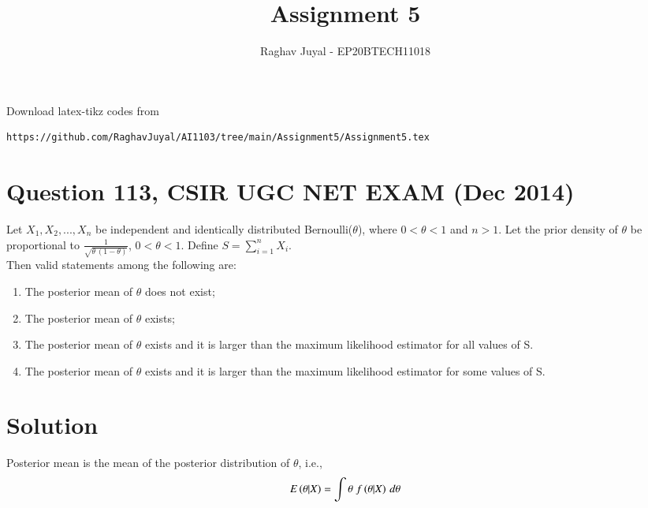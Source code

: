\documentclass[journal,12pt,twocolumn]{IEEEtran}
\begin{document}
\let\vec\mathbf
\renewcommand{\thefigure}{\theproblem}
\def\putbox#1#2#3{\makebox[0in][l]{\makebox[#1][l]{}\raisebox{\baselineskip}[0in][0in]{\raisebox{#2}[0in][0in]{#3}}}}
     \def\rightbox#1{\makebox[0in][r]{#1}}
     \def\centbox#1{\makebox[0in]{#1}}
     \def\topbox#1{\raisebox{-\baselineskip}[0in][0in]{#1}}
     \def\midbox#1{\raisebox{-0.5\baselineskip}[0in][0in]{#1}}
\vspace{3cm}
\title{Assignment 5}
\author{Raghav Juyal - EP20BTECH11018}
\maketitle
\newpage
\bigskip
\renewcommand{\thefigure}{\theenumi}
\renewcommand{\thetable}{\theenumi}
Download latex-tikz codes from 
%
\begin{lstlisting}
https://github.com/RaghavJuyal/AI1103/tree/main/Assignment5/Assignment5.tex
\end{lstlisting}

\section*{Question 113, CSIR UGC NET EXAM (Dec 2014)}
Let $X_1,X_2,...,X_n$ be independent and identically distributed Bernoulli($\theta$), where $0<\theta<1$ and $n>1$. Let the prior density of $\theta$ be proportional to $\frac{1}{\sqrt{\theta\,(1-\theta)}}$, $0<\theta<1$. Define $S=\sum_{i=1}^nX_i$.\\[1pt] Then valid statements among the following are:
\begin{enumerate}[label = \arabic*.]
    \item The posterior mean of $\theta$ does not exist;
    \item The posterior mean of $\theta$ exists;
    \item The posterior mean of $\theta$ exists and it is larger than the maximum likelihood estimator for all values of S.
    \item The posterior mean of $\theta$ exists and it is larger than the maximum likelihood estimator for some values of S.
\end{enumerate}
\section*{Solution}

\begin{definition}
Posterior mean is the mean of the posterior distribution of $\theta$, i.e., 
\begin{align}
    E\left(\theta|X\right) = \int{\theta\;f\ensuremath{\left(\theta|X\right)}\,d\theta}\label{eq5}
\end{align}
\end{definition}
\end{document}
